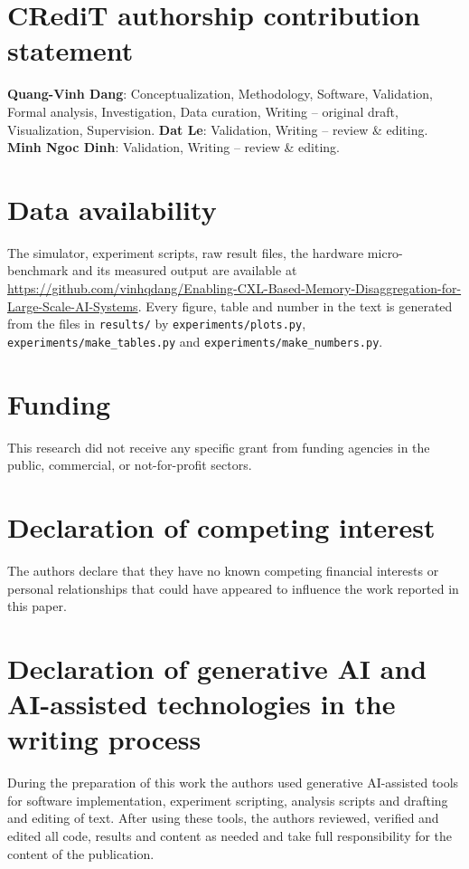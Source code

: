\documentclass[preprint,12pt]{elsarticle}
\begin{document}
\section*{CRediT authorship contribution statement}
\textbf{Quang-Vinh Dang}: Conceptualization, Methodology, Software, Validation, Formal analysis, Investigation, Data curation, Writing -- original draft, Visualization, Supervision. \textbf{Dat Le}: Validation, Writing -- review \& editing. \textbf{Minh Ngoc Dinh}: Validation, Writing -- review \& editing.

\section*{Data availability}
The simulator, experiment scripts, raw result files, the hardware micro-benchmark and its measured output are available at \url{https://github.com/vinhqdang/Enabling-CXL-Based-Memory-Disaggregation-for-Large-Scale-AI-Systems}. Every figure, table and number in the text is generated from the files in \texttt{results/} by \texttt{experiments/plots.py}, \texttt{experiments/make\_tables.py} and \texttt{experiments/make\_numbers.py}.

\section*{Funding}
This research did not receive any specific grant from funding agencies in the public, commercial, or not-for-profit sectors.

\section*{Declaration of competing interest}
The authors declare that they have no known competing financial interests or personal relationships that could have appeared to influence the work reported in this paper.

\section*{Declaration of generative AI and AI-assisted technologies in the writing process}
During the preparation of this work the authors used generative AI-assisted tools for software implementation, experiment scripting, analysis scripts and drafting and editing of text. After using these tools, the authors reviewed, verified and edited all code, results and content as needed and take full responsibility for the content of the publication.



\end{document}

